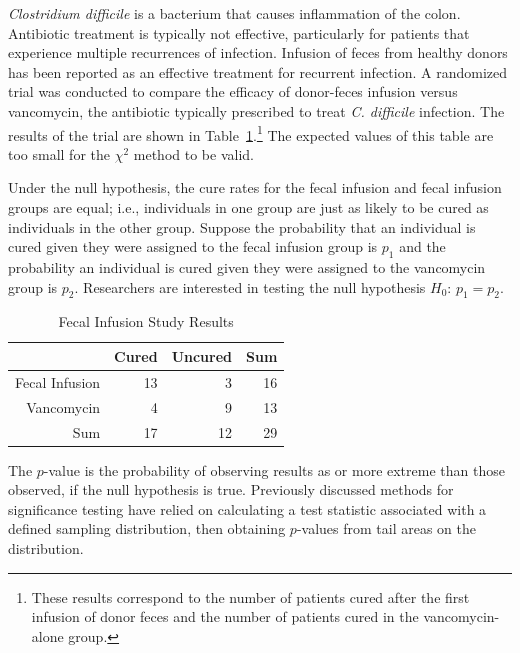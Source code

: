 \textit{Clostridium difficile} is a bacterium that causes inflammation of the colon. Antibiotic treatment is typically not effective, particularly for patients that experience multiple recurrences of infection. Infusion of feces from healthy donors has been reported as an effective treatment for recurrent infection. A randomized trial was conducted to compare the efficacy of donor-feces infusion versus vancomycin, the antibiotic typically prescribed to treat \textit{C. difficile }infection. The results of the trial are shown in Table~\ref{fecalStudyResultsTest}.\footnote{These results correspond to the number of patients cured after the first infusion of donor feces and the number of patients cured in the vancomycin-alone group.} The expected values of this table are too small for the $\chi^2$ method to be valid.


Under the null hypothesis, the cure rates for the fecal infusion and fecal infusion groups are equal; i.e., individuals in one group are just as likely to be cured as individuals in the other group. Suppose the probability that an individual is cured given they were assigned to the fecal infusion group is $p_1$ and the probability an individual is cured given they were assigned to the vancomycin group is $p_2$. Researchers are interested in testing the null hypothesis $H_0$: $p_1 = p_2$.


\begin{table}[h]
	\centering
	\begin{tabular}{rrrr}
		\hline
		& Cured & Uncured & Sum \\ 
		\hline
		Fecal Infusion & 13 & 3 & 16 \\ 
		Vancomycin & 4 & 9 & 13 \\ 
		Sum & 17 & 12 & 29 \\ 
		\hline
	\end{tabular}
	\caption{Fecal Infusion Study Results} 
	\label{fecalStudyResultsTest}
\end{table}

The $p$-value is the probability of observing results as or more extreme than those observed, if the null hypothesis is true. Previously discussed methods for significance testing have relied on calculating a test statistic associated with a defined sampling distribution, then obtaining $p$-values from tail areas on the distribution. 

